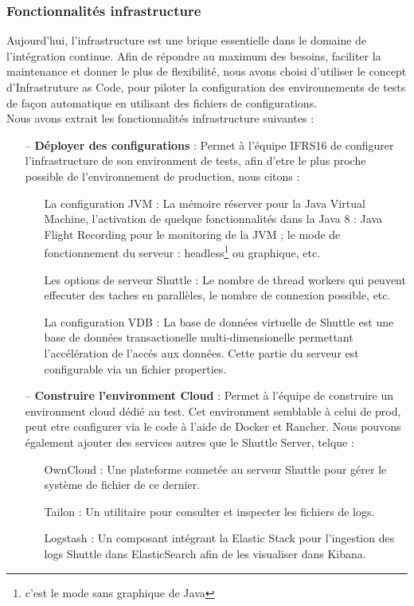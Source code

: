\begin{spacing}{1.2}
\subsubsection{Fonctionnalités infrastructure}
Aujourd'hui, l'infrastructure est une brique essentielle dans le domaine de l'intégration continue. Afin de répondre au maximum des besoins, faciliter la maintenance et donner le plus de flexibilité, nous avons choisi d'utiliser le concept d'Infrastruture as Code, pour piloter la configuration des environnements de tests de façon automatique en utilisant des fichiers de configurations. \\
Nous avons extrait les fonctionnalités infrastructure suivantes :
\begin{itemize}
\setlength\itemsep{0em}
\item[--] \textbf{Déployer des configurations} : Permet à l'équipe IFRS16 de configurer l'infrastructure de son environment de tests, afin d'etre le plus proche possible de l'environnement de production, nous citons :
    \begin{itemize}
    \setlength\itemsep{0em}
    \item[\textbullet] La configuration JVM : La mémoire réserver pour la Java Virtual Machine, l'activation de quelque fonctionnalités dans la Java 8 : Java Flight Recording pour le monitoring de la JVM ; le mode de fonctionnement du serveur : headless\footnote{c'est le mode sans graphique de Java} ou graphique, etc.
    \item[\textbullet] Les options de serveur Shuttle : Le nombre de thread workers qui peuvent effecuter des taches en parallèles, le nombre de connexion possible, etc.
    \item[\textbullet] La configuration VDB : La base de données virtuelle de Shuttle est une base de données transactionelle multi-dimensionelle permettant l'accélération de l'accés aux données. Cette partie du serveur est configurable via un fichier properties.
    \end{itemize}
\item[--] \textbf{Construire l'environment Cloud} :
Permet à l'équipe de construire un environment cloud dédié au test. Cet environment semblable à celui de prod, peut etre configurer via le code à l'aide de Docker et Rancher. Nous pouvons également ajouter des services autres que le Shuttle Server, telque : 
    \begin{itemize}
    \setlength\itemsep{0em}
    \item[\textbullet] OwnCloud : Une plateforme connetée au serveur Shuttle pour gérer le système de fichier de ce dernier.
    \item[\textbullet] Tailon : Un utilitaire pour consulter et inspecter les fichiers de logs.
    \item[\textbullet] Logstash : Un composant intégrant la Elastic Stack pour l'ingestion des logs Shuttle dans ElasticSearch afin de les visualiser dans Kibana.
    \end{itemize}
\end{itemize}

\end{spacing}
